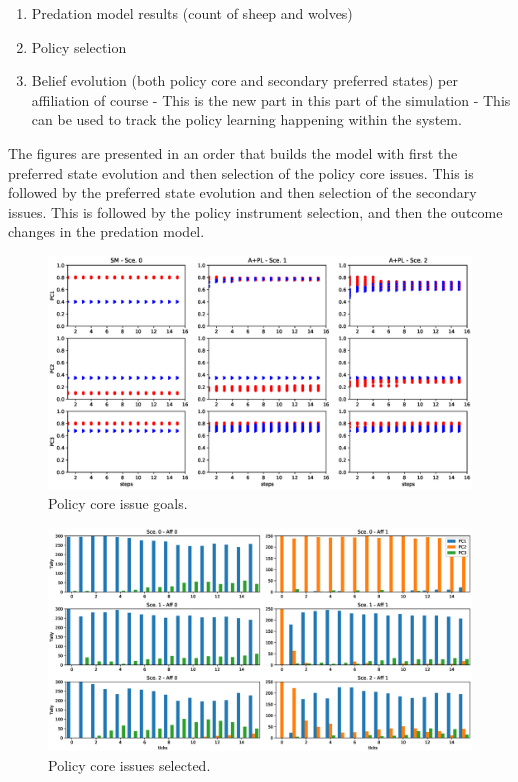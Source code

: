\documentclass[12pt]{article}
\begin{document}
\begin{enumerate}
\item Predation model results (count of sheep and wolves)
\item Policy selection
\item Belief evolution (both policy core and secondary preferred states) per affiliation of course - This is the new part in this part of the simulation - This can be used to track the policy learning happening within the system.
\end{enumerate}

The figures are presented in an order that builds the model with first the preferred state evolution and then selection of the policy core issues. This is followed by the preferred state evolution and then selection of the secondary issues. This is followed by the policy instrument selection, and then the outcome changes in the predation model.

\begin{figure}
\centering
\includegraphics[width = 0.95\linewidth, angle = 0]{figures/PE_PL_PCGoals}
\caption{Policy core issue goals.}
\label{fig:PE_PL_PCGoals}
\end{figure}

\begin{figure}
\centering
\includegraphics[width = 0.95\linewidth, angle = 0]{figures/PE_PL_PCSelected}
\caption{Policy core issues selected.}
\label{fig:PE_PL_PCSelected}
\end{figure}
\end{document}
